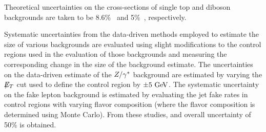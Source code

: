
Theoretical uncertainties on the cross-sections of single top and diboson
backgrounds are taken to be 8.6\%~\cite{PhysRevD.83.091503} and 5\%~\cite{Campbell:2010ff},
respectively.

%

Systematic uncertainties from the data-driven methods employed to estimate the size
of various backgrounds are evaluated using slight modifications to the control
regions used in the evaluation of those backgrounds and measuring the corresponding
change in the size of the background estimate.
The uncertainties on the data-driven estimate of the $Z/\gamma^{*}$ background
are estimated by varying the $\not\!\!{E_{T}}$ cut used to define the control
region by $\pm 5\GeV$.
The systematic uncertainty on the fake lepton background is estimated by evaluating
the jet fake rates in control regions with varying flavor composition (where the
flavor composition is determined using Monte Carlo).
From these studies, and overall uncertainty of 50\% is obtained.

